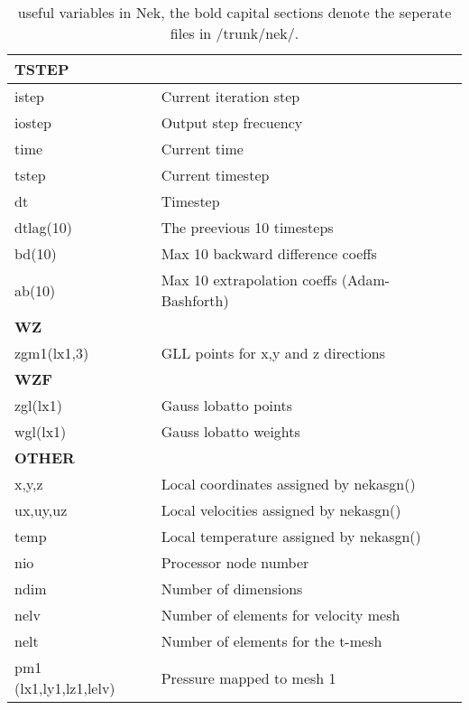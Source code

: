 \begin{table}
\begin{tabular}{l l}
\multicolumn{2}{l}{\textbf{TSTEP}}\\ \hline
istep                            & Current iteration step\\
iostep                           & Output step frecuency\\
time                             & Current time\\
tstep                            & Current timestep	\\
dt                               & Timestep\\
dtlag(10)                        & The preevious 10 timesteps\\
bd(10)                           & Max 10 backward difference coeffs\\
ab(10)                           & Max 10 extrapolation coeffs (Adam-Bashforth)\\

\multicolumn{2}{l}{\textbf{WZ}}\\ \hline
zgm1(lx1,3)                      & GLL points for x,y and z directions \\

\multicolumn{2}{l}{\textbf{WZF}}\\ \hline            
zgl(lx1)                         & Gauss lobatto points\\
wgl(lx1)                         & Gauss lobatto weights\\

\multicolumn{2}{l}{\textbf{OTHER}}\\ \hline            
x,y,z                            & Local coordinates assigned by nekasgn()\\
ux,uy,uz                         & Local velocities assigned by nekasgn()\\
temp                             & Local temperature assigned by nekasgn()\\
nio                              & Processor node number  \\
ndim                             & Number of dimensions\\
nelv                             & Number of elements for velocity mesh\\
nelt                             & Number of elements for the t-mesh\\
pm1 (lx1,ly1,lz1,lelv)           & Pressure mapped to mesh 1\\

\end{tabular}

\caption{useful variables in Nek, the bold capital sections denote the seperate files in /trunk/nek/.}

\label{tab:variables}
\end{table}

